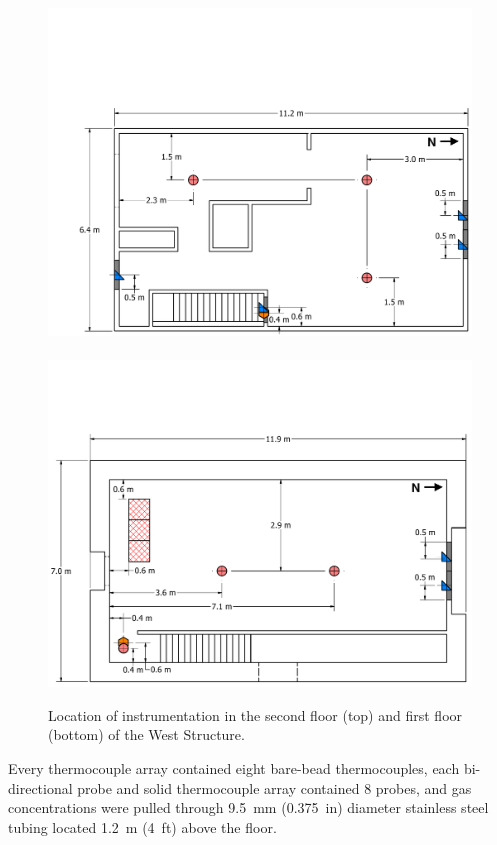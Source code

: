 \documentclass[12pt,oneside]{book}
\begin{document}
\begin{figure}[!ht]
	\includegraphics[width=\columnwidth]{../Figures/Floor_Plans/West_Structure_2nd_Floor_Dimensioned_Instrumentation}
	\\~\\
	\includegraphics[width=\columnwidth]{../Figures/Floor_Plans/West_Structure_1st_Floor_Dimensioned_Instrumentation}
	\caption[Location of instrumentation in the West Structure.]{Location of instrumentation in the second floor (top) and first floor (bottom) of the West Structure.}
	\label{fig:west_instrumentation}
\end{figure}

Every thermocouple array contained eight bare-bead thermocouples, each bi-directional probe and solid thermocouple array contained 8 probes, and gas concentrations were pulled through 9.5~mm (0.375~in) diameter stainless steel tubing located 1.2~m (4~ft) above the floor.
\clearpage
\end{document}
